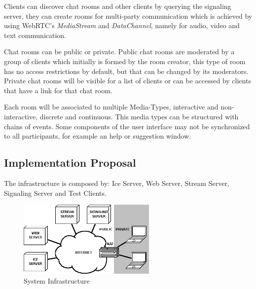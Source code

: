 Clients can discover chat rooms and other clients by querying the signaling server, they can create rooms for multi-party communication which is achieved by using \ac{WebRTC}'s \emph{MediaStream} and \emph{DataChannel}, namely for audio, video and text communication.

Chat rooms can be public or private. Public chat rooms are moderated by a group of clients which initially is formed by the room creator, this type of room has no access restrictions by default, but that can be changed by its moderators. Private chat rooms will be visible for a list of clients or can be accessed by clients that have a link for that chat room.

Each room will be associated to multiple Media-Types, interactive and non-interactive, discrete and continuous. This media types can be structured with chains of events. Some components of the user interface may not be synchronized to all participants, for example an help or suggestion window.  


 
\subsection{Implementation Proposal}
The infrastructure is composed by: Ice Server, Web Server, Stream Server, Signaling Server and Test Clients.

\begin{figure}[H]
	\centering
	\includegraphics[width=0.6\textwidth]{figures/arch.png}
	\caption{System Infrastructure}
\end{figure}

